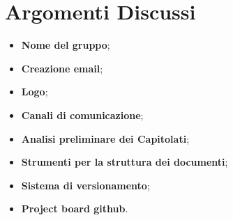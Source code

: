 
\section{Argomenti Discussi}
	\begin{itemize}
		\item \textbf {Nome del gruppo};
		\item \textbf {Creazione email};
		\item \textbf {Logo};
		\item \textbf {Canali di comunicazione};
		\item \textbf {Analisi preliminare dei Capitolati\glos};
		\item \textbf {Strumenti per la struttura dei documenti};
		\item \textbf {Sistema di versionamento};
		\item \textbf {Project board github}.
	\end{itemize}
